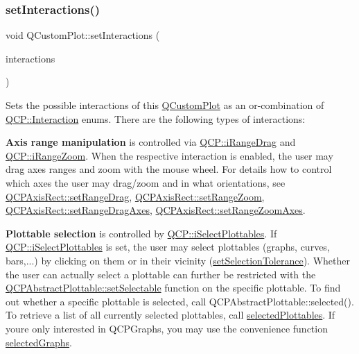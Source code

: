 \subsubsection{\texorpdfstring{set\+Interactions()}{setInteractions()}}
{\footnotesize\ttfamily void Q\+Custom\+Plot\+::set\+Interactions (\begin{DoxyParamCaption}\item[{const Q\+C\+P\+::\+Interactions \&}]{interactions }\end{DoxyParamCaption})}

Sets the possible interactions of this \hyperlink{class_q_custom_plot}{Q\+Custom\+Plot} as an or-\/combination of \hyperlink{namespace_q_c_p_a2ad6bb6281c7c2d593d4277b44c2b037}{Q\+C\+P\+::\+Interaction} enums. There are the following types of interactions\+:

{\bfseries Axis range manipulation} is controlled via \hyperlink{namespace_q_c_p_a2ad6bb6281c7c2d593d4277b44c2b037a2c4432b9aceafb94000be8d1b589ef18}{Q\+C\+P\+::i\+Range\+Drag} and \hyperlink{namespace_q_c_p_a2ad6bb6281c7c2d593d4277b44c2b037abee1e94353525a636aeaf0ba32b72e14}{Q\+C\+P\+::i\+Range\+Zoom}. When the respective interaction is enabled, the user may drag axes ranges and zoom with the mouse wheel. For details how to control which axes the user may drag/zoom and in what orientations, see \hyperlink{class_q_c_p_axis_rect_ae6aef2f7211ba6097c925dcd26008418}{Q\+C\+P\+Axis\+Rect\+::set\+Range\+Drag}, \hyperlink{class_q_c_p_axis_rect_a7960a9d222f1c31d558b064b60f86a31}{Q\+C\+P\+Axis\+Rect\+::set\+Range\+Zoom}, \hyperlink{class_q_c_p_axis_rect_a648cce336bd99daac4a5ca3e5743775d}{Q\+C\+P\+Axis\+Rect\+::set\+Range\+Drag\+Axes}, \hyperlink{class_q_c_p_axis_rect_a9442cca2aa358405f39a64d51eca13d2}{Q\+C\+P\+Axis\+Rect\+::set\+Range\+Zoom\+Axes}.

{\bfseries Plottable selection} is controlled by \hyperlink{namespace_q_c_p_a2ad6bb6281c7c2d593d4277b44c2b037a67148c8227b4155eca49135fc274c7ec}{Q\+C\+P\+::i\+Select\+Plottables}. If \hyperlink{namespace_q_c_p_a2ad6bb6281c7c2d593d4277b44c2b037a67148c8227b4155eca49135fc274c7ec}{Q\+C\+P\+::i\+Select\+Plottables} is set, the user may select plottables (graphs, curves, bars,...) by clicking on them or in their vicinity (\hyperlink{class_q_custom_plot_a4dc31241d7b09680950e19e5f971ed93}{set\+Selection\+Tolerance}). Whether the user can actually select a plottable can further be restricted with the \hyperlink{class_q_c_p_abstract_plottable_a22c69299eb5569e0f6bf084877a37dc4}{Q\+C\+P\+Abstract\+Plottable\+::set\+Selectable} function on the specific plottable. To find out whether a specific plottable is selected, call Q\+C\+P\+Abstract\+Plottable\+::selected(). To retrieve a list of all currently selected plottables, call \hyperlink{class_q_custom_plot_a747faaab57c56891e901a1e97fa4359a}{selected\+Plottables}. If you\textquotesingle{}re only interested in Q\+C\+P\+Graphs, you may use the convenience function \hyperlink{class_q_custom_plot_ad3547aded026d8a9ae6ef13a69080d06}{selected\+Graphs}.

